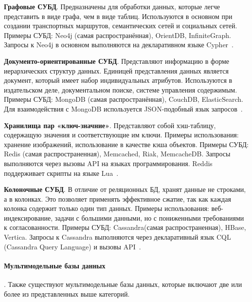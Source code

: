 \begin{compactitem}
	\item \textbf{Графовые СУБД}. Предназначены для обработки данных, которые легче представить в виде графа,
	чем в виде таблиц. Используются в основном при создании транспортных маршрутов,
	семантических сетей и социальных сетей. Примеры СУБД: Neo4j (самая распространённая),
	OrientDB, InfiniteGraph. Запросы к Neo4j в основном выполняются на декларативном языке
	Cypher~\cite{maranAlternativeApproachesData2020, savoskinIssledovanieSposobovPrimeneniya2019}.
	\item \textbf{Документо-ориентированные СУБД}. Представляют информацию в форме иерархических структур данных.
	Единицей представления данных является документ, который имеет набор индивидуальных атрибутов. Используются в
	издательском деле, документальном поиске, системе управления содержимым. Примеры СУБД:
	MongoDB (самая распространённая), CouchDB, ElasticSearch.
	Для взаимодействия с MongoDB используется JSON-подобный язык запросов~\cite{maranAlternativeApproachesData2020,
		savoskinIssledovanieSposobovPrimeneniya2019}.
	\item \textbf{Хранилища пар «ключ-значние»}. Представляют собой хэш-таблицу,
	содержащую значения и соответствующие им ключи. Примеры использования: хранение изображений,
	использование в качестве кэша объектов. Примеры СУБД: Redis (самая распространенная), Memcached, Riak, MemcacheDB.
	Запросы выполняются через вызовы API на языках программирования. Reddis поддерживает скрипты на языке
	Lua~\cite{ivanovObzorSovremennyhNoSQL2019,savoskinIssledovanieSposobovPrimeneniya2019}.
	\item \textbf{Колоночные СУБД}. В отличие от реляционных БД, хранят данные не строками, а в колонках. Это
	позволяет применять эффективное сжатие, так как каждая колонка содержит только один тип данных.
	Примеры использования: веб-индексирование, задачи с большими данными, но с пониженными требованиями
	к согласованности. Примеры СУБД: Cassandra(самая распространенная), HBase, Vertica.
	Запросы к Cassandra выполняются через декларативный язык CQL (Cassandra Query Language) и вызовы
	API~\cite{ivanovObzorSovremennyhNoSQL2019,savoskinIssledovanieSposobovPrimeneniya2019}.
\end{compactitem}

\paragraph{Мультимодельные базы данных}. Также существуют мультимодельные базы данных,
которые включают две или более из представленных выше категорий.

